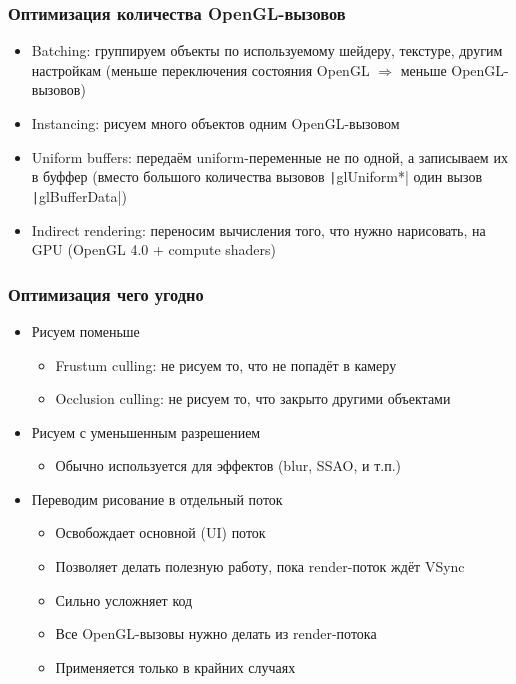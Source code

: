 \documentclass{beamer}
\begin{document}
\begin{frame}[fragile]
\frametitle{Оптимизация количества OpenGL-вызовов}
\begin{itemize}
\item Batching: группируем объекты по используемому шейдеру, текстуре, другим настройкам (меньше переключения состояния OpenGL \begin{math}\Longrightarrow\end{math} меньше OpenGL-вызовов)
\pause
\item Instancing: рисуем много объектов одним OpenGL-вызовом
\pause
\item Uniform buffers: передаём uniform-переменные не по одной, а записываем их в буффер (вместо большого количества вызовов \texttt|glUniform*| один вызов \texttt|glBufferData|)
\pause
\item Indirect rendering: переносим вычисления того, что нужно нарисовать, на GPU (OpenGL 4.0 + compute shaders)
\end{itemize}
\end{frame}

\begin{frame}[fragile]
\frametitle{Оптимизация чего угодно}
\begin{itemize}
\item Рисуем поменьше
\pause
\begin{itemize}
\item Frustum culling: не рисуем то, что не попадёт в камеру
\pause
\item Occlusion culling: не рисуем то, что закрыто другими объектами
\end{itemize}
\pause
\item Рисуем с уменьшенным разрешением
\pause
\begin{itemize}
\item Обычно используется для эффектов (blur, SSAO, и т.п.)
\end{itemize}
\pause
\item Переводим рисование в отдельный поток
\pause
\begin{itemize}
\item Освобождает основной (UI) поток
\pause
\item Позволяет делать полезную работу, пока render-поток ждёт VSync
\pause
\item Сильно усложняет код
\pause
\item Все OpenGL-вызовы нужно делать из render-потока
\pause
\item Применяется только в крайних случаях
\end{itemize}
\end{itemize}
\end{frame}
\end{document}
